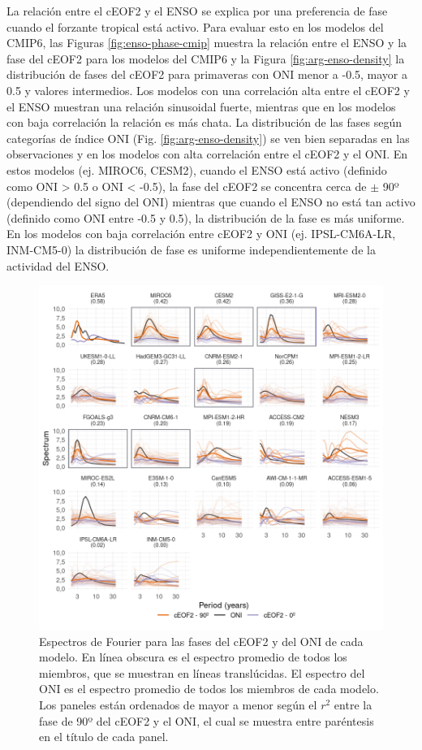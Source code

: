 \documentclass[12pt,oneside,a4paper]{reedthesis}
\begin{document}
La relación entre el cEOF2 y el ENSO se explica por una preferencia de fase cuando el forzante tropical está activo.
Para evaluar esto en los modelos del CMIP6, las Figuras \ref{fig:enso-phase-cmip} muestra la relación entre el ENSO y la fase del cEOF2 para los modelos del CMIP6 y la Figura \ref{fig:arg-enso-density} la distribución de fases del cEOF2 para primaveras con ONI menor a -0.5, mayor a 0.5 y valores intermedios.
Los modelos con una correlación alta entre el cEOF2 y el ENSO muestran una relación sinusoidal fuerte, mientras que en los modelos con baja correlación la relación es más chata.
La distribución de las fases según categorías de índice ONI (Fig. \ref{fig:arg-enso-density}) se ven bien separadas en las observaciones y en los modelos con alta correlación entre el cEOF2 y el ONI.
En estos modelos (ej. MIROC6, CESM2), cuando el ENSO está activo (definido como ONI \textgreater{} 0.5 o ONI \textless{} -0.5), la fase del cEOF2 se concentra cerca de \(\pm\) 90º (dependiendo del signo del ONI) mientras que cuando el ENSO no está tan activo (definido como ONI entre -0.5 y 0.5), la distribución de la fase es más uniforme.
En los modelos con baja correlación entre cEOF2 y ONI (ej. IPSL-CM6A-LR, INM-CM5-0) la distribución de fase es uniforme independientemente de la actividad del ENSO.

\begin{figure}

{\centering \includegraphics{figures/50-cmip6/fft-ceof2-1} 

}

\caption{Espectros de Fourier para las fases del cEOF2 y del ONI de cada modelo. En línea obscura es el espectro promedio de todos los miembros, que se muestran en líneas translúcidas. El espectro del ONI es el espectro promedio de todos los miembros de cada modelo. Los paneles están ordenados de mayor a menor según el \(r^2\) entre la fase de 90º del cEOF2 y el ONI, el cual se muestra entre paréntesis en el título de cada panel.}\label{fig:fft-ceof2}
\end{figure}
\end{document}
